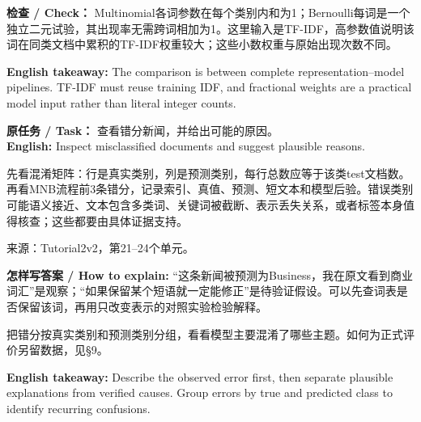 \textbf{检查 / Check：} Multinomial各词参数在每个类别内和为1；Bernoulli每词是一个独立二元试验，其出现率无需跨词相加为1。这里输入是TF-IDF，高参数值说明该词在同类文档中累积的TF-IDF权重较大；这些小数权重与原始出现次数不同。


\textbf{English takeaway:} The comparison is between complete representation–model pipelines. TF-IDF must reuse training IDF, and fractional weights are a practical model input rather than literal integer counts.











\textbf{原任务 / Task：} 查看错分新闻，并给出可能的原因。\\

\textbf{English:} Inspect misclassified documents and suggest plausible reasons.


先看混淆矩阵：行是真实类别，列是预测类别，每行总数应等于该类test文档数。再看MNB流程前3条错分，记录索引、真值、预测、短文本和模型后验。错误类别可能语义接近、文本包含多类词、关键词被截断、表示丢失关系，或者标签本身值得核查；这些都要由具体证据支持。


来源：Tutorial2v2，第21–24个单元。








\textbf{怎样写答案 / How to explain:} “这条新闻被预测为Business，我在原文看到商业词汇”是观察；“如果保留某个短语就一定能修正”是待验证假设。可以先查词表是否保留该词，再用只改变表示的对照实验检验解释。


把错分按真实类别和预测类别分组，看看模型主要混淆了哪些主题。如何为正式评价另留数据，见§9。


\textbf{English takeaway:} Describe the observed error first, then separate plausible explanations from verified causes. Group errors by true and predicted class to identify recurring confusions.


